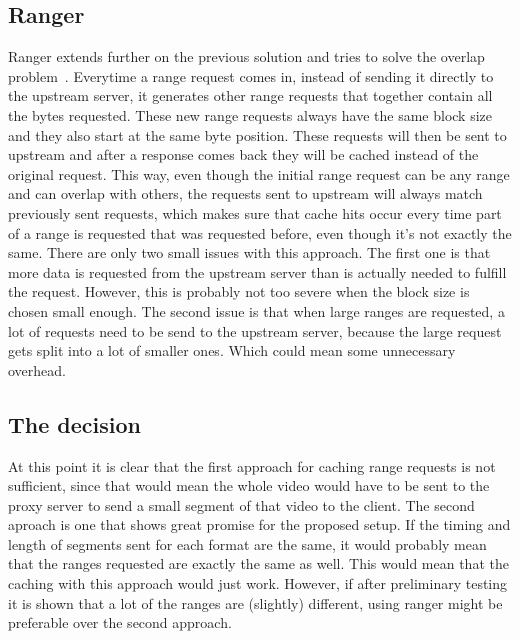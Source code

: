 \documentclass[twoside,openright]{uva-bachelor-thesis}
\begin{document}
\subsection{Ranger}
Ranger extends further on the previous solution and tries to solve the overlap
problem~\autocite{ranger}. Everytime a range request comes in, instead of
sending it directly to the upstream server, it generates other range requests
that together contain all the bytes requested. These new range requests always
have the same block size and they also start at the same byte position.  These
requests will then be sent to upstream and after a response comes back they will
be cached instead of the original request.  This way, even though the initial
range request can be any range and can overlap with others, the requests sent to
upstream will always match previously sent requests, which makes sure that cache
hits occur every time part of a range is requested that was requested before,
even though it's not exactly the same. There are only two small issues with this
approach.  The first one is that more data is requested from the upstream server
than is actually needed to fulfill the request. However, this is probably not
too severe when the block size is chosen small enough. The second issue is that
when large ranges are requested, a lot of requests need to be send to the
upstream server, because the large request gets split into a lot of smaller
ones. Which could mean some unnecessary overhead.

\subsection{The decision}
At this point it is clear that the first approach for caching range requests is
not sufficient, since that would mean the whole video would have to be sent to
the proxy server to send a small segment of that video to the client. The second
aproach is one that shows great promise for the proposed setup. If the timing
and length of segments sent for each format are the same, it would probably mean
that the ranges requested are exactly the same as well. This would mean that the
caching with this approach would just work. However, if after preliminary
testing it is shown that a lot of the ranges are (slightly) different, using
ranger might be preferable over the second approach.
\end{document}
